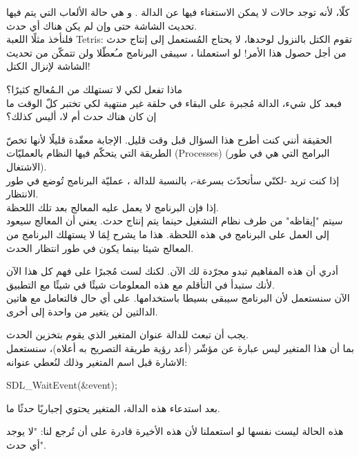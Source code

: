كلّا، لأنه توجد حالات لا يمكن الاستغناء فيها عن الدالة 
.
و هي حالة الألعاب التي يتم فيها تحديث الشاشة حتى وإن لم يكن هناك أي حدث.\\
فلنأخذ مثلًا اللعبة 
\textenglish{Tetris}:
تقوم الكتل بالنزول لوحدها، لا يحتاج المُستعمل إلى إنتاج حدث من أجل حصول هذا الأمر! لو استعملنا
،
سيبقى البرنامج مـُعطّلا ولن تتمكّن من تحديث الشاشة لإنزال الكتل!

\begin{question}
ماذا تفعل
لكي لا تستهلك من الـمُعالج كثيرًا؟\\
فبعد كل شيء، الدالة مُجبرة على البقاء في حلقة غير منتهية لكي تختبر كلّ الوقت ما إن كان هناك حدث أم لا، أليس كذلك؟
\end{question}

الحقيقة أنني كنت أطرح هذا السؤال قبل وقت قليل. الإجابة معقّدة قليلًا لأنها تخصّ الطريقة التي يتحكّم فيها النظام بالعمليّات 
(\textenglish{Processes})
(البرامج التي هي في طور الاشتغال).\\
إذا كنت تريد -لكنّي سأتحدّث بسرعة-، بالنسبة للدالة 
،
عمليّة البرنامج تُوضع في طور الانتظار.\\
إذا فإن البرنامج لا يعمل عليه المعالج بعد تلك اللحظة.\\
سيتم "إيقاظه" من طرف نظام التشغيل حينما يتم إنتاج حدث. يعني أن المعالج سيعود إلى العمل على البرنامج في هذه اللحظة. هذا ما يشرح لِمَا لا يستهلك البرنامج من المعالج شيئا بينما يكون في طور انتظار الحدث.

أدري أن هذه المفاهيم تبدو مجرّدة لك الآن. لكنك لست مُجبرًا على فهم كل هذا الآن لأنك ستبدأ في التأقلم مع هذه المعلومات شيئًا في شيئًا مع التطبيق.\\
الآن سنستعمل 
لأن البرنامج سيبقى بسيطا باستخدامها. على أي حال فالتعامل مع هاتين الدالتين لن يتغير من واحدة إلى أخرى.

يجب أن تبعث للدالة عنوان المتغير 
الذي يقوم بتخزين الحدث.\\
بما أن هذا المتغير ليس عبارة عن مؤشّر (أعد رؤية طريقة التصريح به أعلاه)، سنستعمل الاشارة
\InlineCode{\&}
قبل اسم المتغير وذلك لنُعطي عنوانه:

\begin{Csource}
SDL_WaitEvent(&event);
\end{Csource}

بعد استدعاء هذه الدالة، المتغير
يحتوي إجباريًا حدثًا ما.

\begin{information}
هذه الحالة ليست نفسها لو استعملنا
لأن هذه الأخيرة قادرة على أن تُرجع لنا: "لا يوجد أي حدث".
\end{information}

